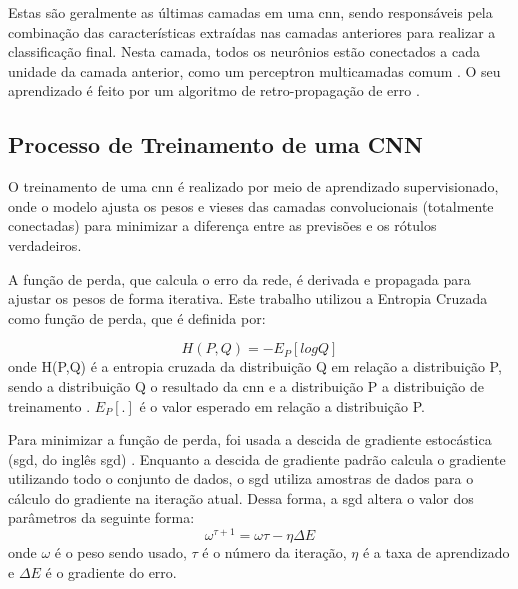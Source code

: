 Estas são geralmente as últimas camadas em uma \acrshort{cnn}, sendo responsáveis pela combinação das características extraídas nas camadas anteriores para realizar a classificação final. 
Nesta camada, todos os neurônios estão conectados a cada unidade da camada anterior, como um perceptron multicamadas comum \cite{MURTAGH1991183}. 
O seu aprendizado é feito por um algoritmo de retro-propagação de erro \cite{Rumelhart1986LearningRB}.
\subsection{Processo de Treinamento de uma CNN}

O treinamento de uma \acrshort{cnn} é realizado por meio de aprendizado supervisionado, onde o modelo ajusta os pesos e vieses das camadas convolucionais (totalmente conectadas) para minimizar a diferença entre as previsões e os rótulos verdadeiros.

A função de perda, que calcula o erro da rede, é derivada e propagada para ajustar os pesos de forma iterativa. 
Este trabalho utilizou a Entropia Cruzada como função de perda, que é definida por:

\begin{equation}
    \label{eqn:crossentropy}
    H(P,Q) = -E_{P}[log Q]
\end{equation}
onde H(P,Q) é a entropia cruzada da distribuição Q em relação a distribuição P, sendo a distribuição Q o resultado da \acrshort{cnn} e a distribuição P a distribuição de treinamento \cite{mao2023}. 
$E_{P}[.]$ é o valor esperado em relação a distribuição P.

Para minimizar a função de perda, foi usada a descida de gradiente estocástica (\acrshort{sgd}, do inglês \acrlong{sgd}) \cite{ruder2016}. Enquanto a descida de gradiente padrão calcula o gradiente utilizando todo o conjunto de dados, o \acrshort{sgd} utiliza amostras de dados para o cálculo do gradiente na iteração atual.
Dessa forma, a \acrshort{sgd} altera o valor dos parâmetros da seguinte forma:
\begin{equation}
    \label{eqn:sgd}
    \omega^{\tau+1} = \omega{\tau} - \eta\Delta{E}
\end{equation}
onde $\omega$ é o peso sendo usado, $\tau$ é o número da iteração, $\eta$ é a taxa de aprendizado e $\Delta{E}$ é o gradiente do erro.

